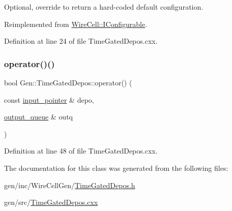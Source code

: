 Optional, override to return a hard-\/coded default configuration. 



Reimplemented from \hyperlink{class_wire_cell_1_1_i_configurable_a54841b2da3d1ea02189478bff96f7998}{Wire\+Cell\+::\+I\+Configurable}.



Definition at line 24 of file Time\+Gated\+Depos.\+cxx.

\mbox{\label{class_wire_cell_1_1_gen_1_1_time_gated_depos_ad457a966103e9cd5e0c9b1dba36374d1}} 
\subsubsection{\texorpdfstring{operator()()}{operator()()}}
{\footnotesize\ttfamily bool Gen\+::\+Time\+Gated\+Depos\+::operator() (\begin{DoxyParamCaption}\item[{const \hyperlink{class_wire_cell_1_1_i_queuedout_node_acf5f716a764553f3c7055a9cf67e906e}{input\+\_\+pointer} \&}]{depo,  }\item[{\hyperlink{class_wire_cell_1_1_i_queuedout_node_a39018e4e3dd886befac9636ac791a685}{output\+\_\+queue} \&}]{outq }\end{DoxyParamCaption})\hspace{0.3cm}{\ttfamily [virtual]}}



Definition at line 48 of file Time\+Gated\+Depos.\+cxx.



The documentation for this class was generated from the following files\+:\begin{DoxyCompactItemize}
\item 
gen/inc/\+Wire\+Cell\+Gen/\hyperlink{_time_gated_depos_8h}{Time\+Gated\+Depos.\+h}\item 
gen/src/\hyperlink{_time_gated_depos_8cxx}{Time\+Gated\+Depos.\+cxx}\end{DoxyCompactItemize}
